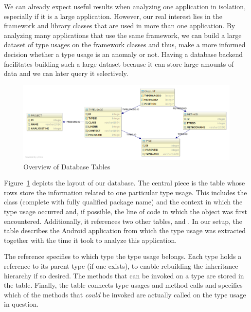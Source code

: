 We can already expect useful results when analyzing one application in isolation, especially if it is a large application.
However, our real interest lies in the framework and library classes that are used in more than one application.
By analyzing many applications that use the same framework, we can build a large dataset of type usages on the framework classes and thus, make a more informed decision whether a type usage is an anomaly or not.
Having a database backend facilitates building such a large dataset because it can store large amounts of data and we can later query it selectively.

\begin{figure}[t]
    \centering
    \includegraphics[width=\textwidth]{figures/database_layout-light}
    \caption{Overview of Database Tables}
    \label{fig:db_layout}
\end{figure}

Figure~\ref{fig:db_layout} depicts the layout of our database.
The central piece is the  table whose rows store the information related to one particular type usage.
This includes the class (complete with fully qualified package name) and the context in which the type usage occurred and, if possible, the line of code in which the object was first encountered.
Additionally, it references two other tables,  and .
In our setup, the  table describes the Android application from which the type usage was extracted together with the time it took to analyze this application.

The  reference specifies to which type the type usage belongs.
Each type holds a reference to its parent type (if one exists), to enable rebuilding the inheritance hierarchy if so desired.
The methods that can be invoked on a type are stored in the  table.
Finally, the  table connects type usages and method calls and specifies which of the methods that \emph{could} be invoked are actually called on the type usage in question.

